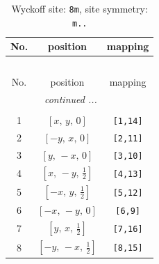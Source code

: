 \documentclass[fleqn,8pt]{jsarticle}
\begin{document}
\begin{longtable}{ccc}
\caption{Wyckoff site: {\tt 8m}, site symmetry: {\tt m..}}
 \\
 \hline \hline
No. & position & mapping \\ \hline \endfirsthead

\multicolumn{2}{l}{\tablename\ \thetable{}} \\
 \hline \hline
No. & position & mapping \\ \hline \endhead

 \hline \hline
\multicolumn{2}{r}{\footnotesize\it continued ...} \\ \endfoot

 \hline \hline
\multicolumn{2}{r}{} \\ \endlastfoot

1 & $\left[ x,\, y,\, 0 \right]$ & {\tt [1,14]} \\ \hline
2 & $\left[ - y,\, x,\, 0 \right]$ & {\tt [2,11]} \\ \hline
3 & $\left[ y,\, - x,\, 0 \right]$ & {\tt [3,10]} \\ \hline
4 & $\left[ x,\, - y,\, \frac{1}{2} \right]$ & {\tt [4,13]} \\ \hline
5 & $\left[ - x,\, y,\, \frac{1}{2} \right]$ & {\tt [5,12]} \\ \hline
6 & $\left[ - x,\, - y,\, 0 \right]$ & {\tt [6,9]} \\ \hline
7 & $\left[ y,\, x,\, \frac{1}{2} \right]$ & {\tt [7,16]} \\ \hline
8 & $\left[ - y,\, - x,\, \frac{1}{2} \right]$ & {\tt [8,15]} \\
\end{longtable}
\renewcommand{\arraystretch}{1.2}
\end{document}
